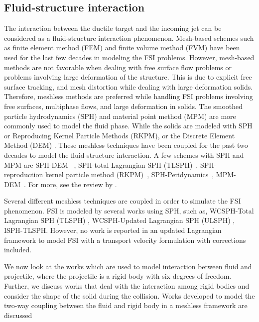 \subsection{Fluid-structure interaction}
The interaction between the ductile target and the incoming jet can be
considered as a fluid-structure interaction phenomenon. Mesh-based schemes such
as finite element method (FEM) \citep{lozovskiy2015unconditionally} and finite
volume method (FVM) \citep{jasak2007updated} have been used for the last few
decades in modeling the FSI problems. However, mesh-based methods are not
favorable when dealing with free surface flow problems or problems involving
large deformation of the structure. This is due to explicit free surface
tracking, and mesh distortion \citep{moresi2003lagrangian} while dealing with
large deformation solids. Therefore, meshless methods are preferred while
handling FSI problems involving free surfaces, multiphase flows, and large
deformation in solids. The smoothed particle hydrodynamics (SPH) and material
point method (MPM) are more commonly used to model the fluid phase. While the
solids are modeled with SPH or Reproducing Kernel Particle Methods (RKPM), or
the Discrete Element Method (DEM) \citep{hu2010material,li2022material}. These
meshless techniques have been coupled for the past two decades to model the
fluid-structure interaction. A few schemes with SPH and MPM are SPH-DEM~
\citep{wu2016coupled}, SPH-total Lagrangian SPH
(TLSPH)~\citep{salehizadeh2022coupled}, SPH-reproduction kernel particle method
(RKPM)~\citep{peng2021coupling}, SPH-Peridynamics~\citep{sun2020smoothed},
MPM-DEM~\citep{singer2022partitioned}. For more, see the review by
\citep{khayyer2022systematic}.

Several different meshless techniques are coupled in order to simulate the FSI
phenomenon. FSI is modeled by several works using SPH, such as, WCSPH-Total
Lagrangian SPH (TLSPH) \citep{zhan2019stabilized}, WCSPH-Updated Lagrangian SPH
(ULSPH) \citep{antoci2007numerical}, ISPH-TLSPH\citep{salehizadeh2022coupled}.
However, no work is reported in an updated Lagrangian framework to model FSI
with a transport velocity formulation with corrections included.


We now look at the works which are used to model interaction between fluid and
projectile, where the projectile is a rigid body with six degrees of freedom.
Further, we discuss works that deal with the interaction among rigid bodies and
consider the shape of the solid during the collision. Works developed to model
the two-way coupling between the fluid and rigid body in a meshless framework
are discussed


